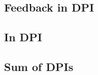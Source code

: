 


\subsection{Feedback in DPI}


\subsection{In DPI}
\label{subsec:dpi-intersection}

\subsection{Sum of DPIs}\label{subsec:dpi-union}

